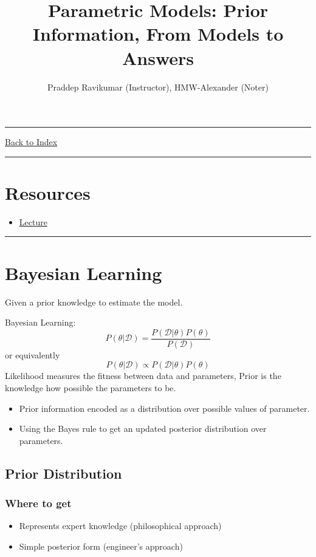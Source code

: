 \documentclass[letterpaper,10pt]{article}
\title{\textbf{Parametric Models: Prior Information, From Models to Answers}}
\author{Praddep Ravikumar (Instructor), HMW-Alexander (Noter)}
\newcommand{\panhline}{\begin{center}\rule{\textwidth}{1pt}\end{center}}
\begin{document}
\maketitle

\panhline
\href{../index.html}{Back to Index}

\panhline
\tableofcontents

\section*{Resources}

\begin{itemize}
	\item \href{../../Lectures/03_ParametricModels.pdf}{Lecture}
\end{itemize}

\panhline

\section{Bayesian Learning}

Given a prior knowledge to estimate the model.

Bayesian Learning:
$$P(\theta|\mathcal{D}) = \frac{P(\mathcal{D}|\theta)P(\theta)}{P(\mathcal{D})}$$
or equivalently
$$P(\theta|\mathcal{D}) \propto P(\mathcal{D}|\theta)P(\theta)$$
Likelihood measures the fitness between data and parameters, Prior is the knowledge how possible the parameters to be.

\begin{itemize}
	\item Prior information encoded as a distribution over possible values of parameter.
	\item Using the Bayes rule to get an updated posterior distribution over parameters.
\end{itemize}

\subsection{Prior Distribution}

\subsubsection{Where to get}

\begin{itemize}
	\item Represents expert knowledge (philosophical approach)
	\item Simple posterior form (engineer's approach)
\end{itemize}
\end{document}
